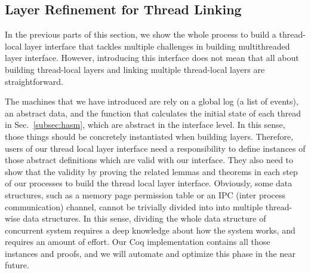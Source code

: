 \subsection{Layer Refinement for Thread Linking}\label{subsec:concrete-impl}

In the previous parts of this section,
we show the whole process to 
build a thread-local layer interface
that tackles 
multiple challenges in building multithreaded layer interface.
However, introducing this interface does not mean that all about building thread-local layers and 
linking multiple thread-local layers are straightforward. 

The machines that we have introduced are rely on a global log (a list of events), an abstract data,
and the function that calculates the initial state of each thread in Sec.~\ref{subsec:hasm},  
which are abstract in the interface level. 
In this sense, those things should be concretely instantiated when building layers. 
Therefore, users of our thread local layer interface need a responsibility to 
define instances of those abstract definitions
which are valid with our interface. 
They also need to show that the validity by proving the related lemmas and theorems 
in each step of our processes to build the thread local layer interface.
Obviously, some data structures, such as a memory page permission table
or an IPC (inter process communication) channel, 
cannot be trivially divided into into multiple thread-wise data structures.
In this sense, dividing the whole data structure of concurrent system requires a deep knowledge about how the system works,
and requires an amount of effort. 
Our Coq implementation contains all those instances and proofs, and 
we will automate and optimize this phase in the near future. 